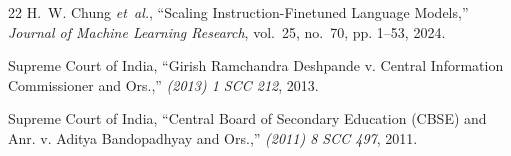 \documentclass[conference]{IEEEtran}
\begin{document}
\begin{thebibliography}{22}
H.~W. Chung \emph{et~al.}, ``Scaling Instruction-Finetuned Language Models,'' \emph{Journal of Machine Learning Research}, vol.~25, no.~70, pp. 1--53, 2024.

Supreme Court of India, ``Girish Ramchandra Deshpande v. Central Information Commissioner and Ors.,'' \emph{(2013) 1 SCC 212}, 2013.

Supreme Court of India, ``Central Board of Secondary Education (CBSE) and Anr. v. Aditya Bandopadhyay and Ors.,'' \emph{(2011) 8 SCC 497}, 2011.

\end{thebibliography}
\end{document}
